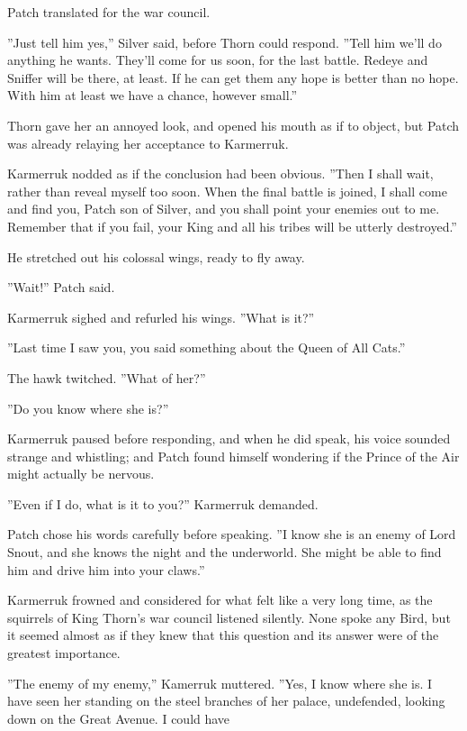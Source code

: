 \documentclass[12pt]{book}
\begin{document}
 Patch translated for the war council.\par
 ''Just tell him yes,'' Silver said, before Thorn could respond. ''Tell him we'll do anything he wants. They'll come for us soon, for the last battle. Redeye and Sniffer will be there, at least. If he can get them %
 any hope is better than no hope. With him at least we have a chance, however small.''\par
 Thorn gave her an annoyed look, and opened his mouth as if to object, but Patch was already relaying her acceptance to Karmerruk.\par
 Karmerruk nodded as if the conclusion had been obvious. ''Then I shall wait, rather than reveal myself too soon. When the final battle is joined, I shall come and find you, Patch son of Silver, and you shall point your enemies out to me. Remember that if you fail, your King and all his tribes will be utterly destroyed.''\par
 He stretched out his colossal wings, ready to fly away.\par
 ''Wait!'' Patch said.\par
 Karmerruk sighed and refurled his wings. ''What is it?''\par
 ''Last time I saw you, you said something about the Queen of All Cats.''\par
 The hawk twitched. ''What of her?''\par
 ''Do you know where she is?''\par
 Karmerruk paused before responding, and when he did speak, his voice sounded strange and whistling; and Patch found himself wondering if the Prince of the Air might actually be nervous.\par
''Even if I do, what is it to you?'' Karmerruk demanded.\par
 Patch chose his words carefully before speaking. ''I know she is an enemy of Lord Snout, and she knows the night and the underworld. She might be able to find him and drive him into your claws.''\par
 Karmerruk frowned and considered for what felt like a very long time, as the squirrels of King Thorn's war council listened silently. None spoke any Bird, but it seemed almost as if they knew that this question and its answer were of the greatest importance.\par
 ''The enemy of my enemy,'' Kamerruk muttered. ''Yes, I know where she is. I have seen her standing on the steel branches of her palace, undefended, looking down on the Great Avenue. I could have %
\end{document}
